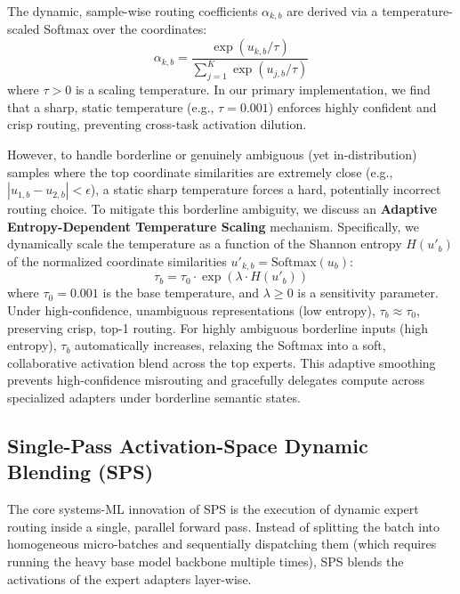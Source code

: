 The dynamic, sample-wise routing coefficients $\alpha_{k, b}$ are derived via a temperature-scaled Softmax over the coordinates:
\begin{equation}
    \alpha_{k, b} = \frac{\exp(u_{k, b} / \tau)}{\sum_{j=1}^K \exp(u_{j, b} / \tau)}
\end{equation}
where $\tau > 0$ is a scaling temperature. In our primary implementation, we find that a sharp, static temperature (e.g., $\tau = 0.001$) enforces highly confident and crisp routing, preventing cross-task activation dilution. 

However, to handle borderline or genuinely ambiguous (yet in-distribution) samples where the top coordinate similarities are extremely close (e.g., $|u_{1,b} - u_{2,b}| < \epsilon$), a static sharp temperature forces a hard, potentially incorrect routing choice. To mitigate this borderline ambiguity, we discuss an \textbf{Adaptive Entropy-Dependent Temperature Scaling} mechanism. Specifically, we dynamically scale the temperature as a function of the Shannon entropy $H(u'_b)$ of the normalized coordinate similarities $u'_{k,b} = \text{Softmax}(u_b)$:
\begin{equation}
    \tau_b = \tau_0 \cdot \exp\left( \lambda \cdot H(u'_b) \right)
\end{equation}
where $\tau_0 = 0.001$ is the base temperature, and $\lambda \ge 0$ is a sensitivity parameter. Under high-confidence, unambiguous representations (low entropy), $\tau_b \approx \tau_0$, preserving crisp, top-1 routing. For highly ambiguous borderline inputs (high entropy), $\tau_b$ automatically increases, relaxing the Softmax into a soft, collaborative activation blend across the top experts. This adaptive smoothing prevents high-confidence misrouting and gracefully delegates compute across specialized adapters under borderline semantic states.

\subsection{Single-Pass Activation-Space Dynamic Blending (SPS)}
The core systems-ML innovation of SPS is the execution of dynamic expert routing inside a single, parallel forward pass. Instead of splitting the batch into homogeneous micro-batches and sequentially dispatching them (which requires running the heavy base model backbone multiple times), SPS blends the activations of the expert adapters layer-wise.

